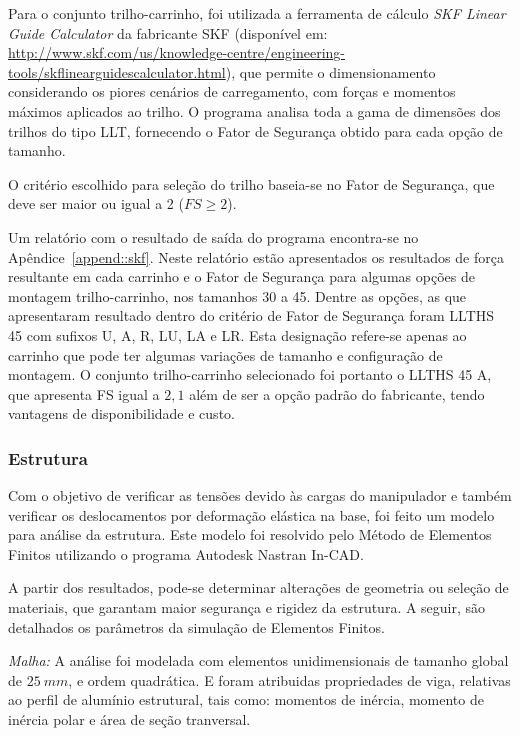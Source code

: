 Para o conjunto trilho-carrinho, foi utilizada a ferramenta de cálculo
\textit{SKF Linear Guide Calculator} da fabricante SKF (disponível em:
\url{http://www.skf.com/us/knowledge-centre/engineering-tools/skflinearguidescalculator.html}),
que permite o dimensionamento considerando os piores cenários de carregamento,
com forças e momentos máximos aplicados ao trilho.
O programa analisa toda a gama de dimensões dos trilhos do tipo LLT, fornecendo
o Fator de Segurança obtido para cada opção de tamanho.

O critério escolhido para seleção do trilho baseia-se no Fator de Segurança, que
deve ser maior ou igual a 2 ($FS\geq2$). 

Um relatório com o resultado de saída do programa encontra-se no Apêndice~\ref{append::skf}. 
Neste relatório estão apresentados os resultados de força resultante em cada
carrinho e o Fator de Segurança para algumas opções de montagem trilho-carrinho,
nos tamanhos 30 a 45. Dentre as opções, as que apresentaram resultado dentro do
critério de Fator de Segurança foram LLTHS 45 com sufixos U, A, R, LU, LA e LR.
Esta designação refere-se apenas ao carrinho que pode ter algumas variações de
tamanho e configuração de montagem. O conjunto trilho-carrinho selecionado foi
portanto o LLTHS 45 A, que apresenta FS igual a $2,1$ além de ser a opção padrão
do fabricante, tendo vantagens de disponibilidade e custo.

\subsubsection{Estrutura}

Com o objetivo de verificar as tensões devido às cargas do manipulador e também
verificar os deslocamentos por deformação elástica na base, foi feito um modelo
para análise da estrutura. Este modelo foi resolvido pelo Método de
Elementos Finitos utilizando o programa Autodesk\textregistered{}
Nastran\textregistered{} In-CAD.

A partir dos resultados, pode-se determinar alterações de geometria ou seleção
de materiais, que garantam maior segurança e rigidez da estrutura.
A seguir, são detalhados os parâmetros da simulação de Elementos Finitos.

\textit{Malha:} A análise foi modelada com elementos unidimensionais
de tamanho global de $25~mm$, e ordem quadrática.  E foram atribuidas propriedades
de viga, relativas ao perfil de alumínio estrutural, tais como:
momentos de inércia, momento de inércia polar e área de seção tranversal.

